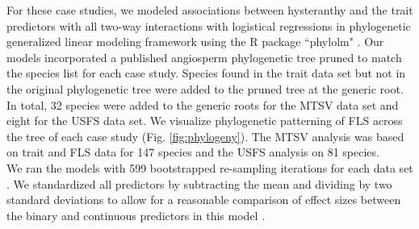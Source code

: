 \documentclass[12pt]{article}\usepackage[]{graphicx}\usepackage[]{color}
\begin{document}
\noindent For these case studies, we modeled associations between hysteranthy and the trait predictors with all two-way interactions with logistical regressions in phylogenetic generalized linear modeling framework \citep{Ives2010} using the R package ``phylolm" \citep{Ho2014}. Our models incorporated a published angiosperm phylogenetic tree \citep{Zanne2013} pruned to match the species list for each case study. Species found in the trait data set but not in the original phylogenetic tree were added to the pruned tree at the generic root. In total, 32 species were added to the generic roots for the MTSV data set and eight for the USFS data set. We visualize phylogenetic patterning of FLS across the tree of each case study (Fig. \ref{fig:phylogeny}). The MTSV analysis was based on trait and FLS data for 147 species and the USFS analysis on 81 species. \\

\noindent We ran the models with 599 bootstrapped re-sampling iterations for each data set \citep{Wilcox2010}. We standardized all predictors by subtracting the mean and dividing by two standard deviations to allow for a reasonable comparison of effect sizes between the binary and continuous predictors in this model \citep{Gelman2007}. 
\end{document}
